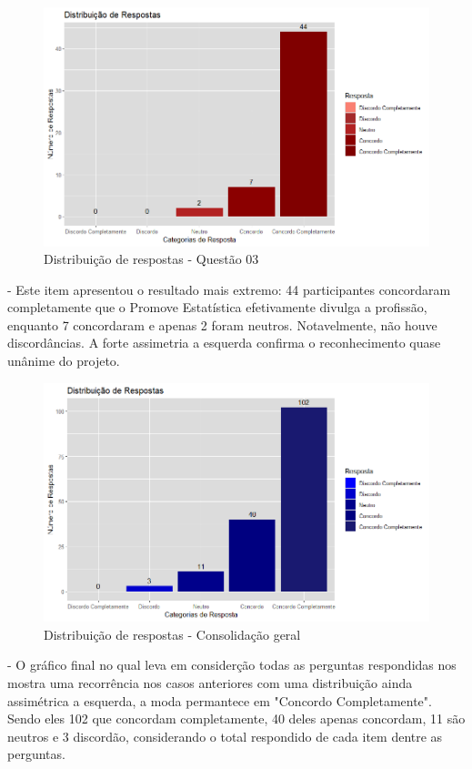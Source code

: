 \documentclass{article}
\begin{document}
\vspace{1cm}

\begin{figure}[htbp]
    \centering
    \includegraphics[width=0.8\linewidth]{Rplot_Q3.png}
    \caption{Distribuição de respostas - Questão 03}
    \label{fig:q3}
\end{figure}

\newpage
- Este item apresentou o resultado mais extremo: 44 participantes concordaram completamente que o Promove Estatística efetivamente divulga a profissão, enquanto 7 concordaram e apenas 2 foram neutros. Notavelmente, não houve discordâncias. A forte assimetria a esquerda confirma o reconhecimento quase unânime do projeto.

\vspace{1.7cm}

\begin{figure}[htbp]
    \centering
    \includegraphics[width=0.8\linewidth]{Rplot_T.png}
    \caption{Distribuição de respostas - Consolidação geral}
    \label{fig:total}
\end{figure}

\vspace{0.5cm}
- O gráfico final no qual leva em considerção todas as perguntas respondidas nos mostra uma recorrência nos casos anteriores com uma distribuição ainda assimétrica a esquerda, a moda permantece em "Concordo Completamente". Sendo eles 102 que concordam completamente, 40 deles apenas concordam, 11 são neutros e 3 discordão, considerando o total respondido de cada item dentre as perguntas.
\end{document}
